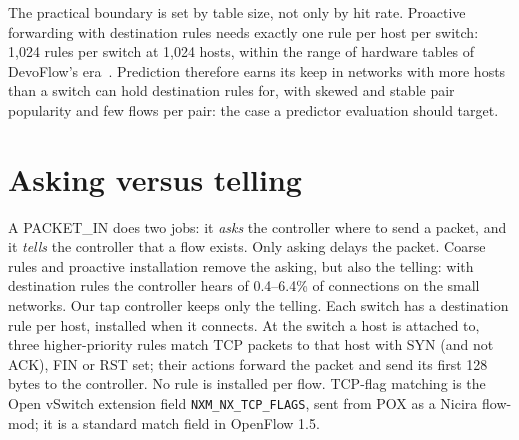\documentclass[sigconf]{acmart}
\begin{document}
The practical boundary is set by table size, not only by hit rate. Proactive forwarding with destination rules needs exactly one rule per host per switch: 1,024 rules per switch at 1,024 hosts, within the range of hardware tables of DevoFlow's era~\cite{devoflow}. Prediction therefore earns its keep in networks with more hosts than a switch can hold destination rules for, with skewed and stable pair popularity and few flows per pair: the case a predictor evaluation should target.

\section{Asking versus telling}\label{sec:tap}

A PACKET\_IN does two jobs: it \emph{asks} the controller where to send a packet, and it \emph{tells} the controller that a flow exists. Only asking delays the packet. Coarse rules and proactive installation remove the asking, but also the telling: with destination rules the controller hears of 0.4--6.4\% of connections on the small networks. Our tap controller keeps only the telling. Each switch has a destination rule per host, installed when it connects. At the switch a host is attached to, three higher-priority rules match TCP packets to that host with SYN (and not ACK), FIN or RST set; their actions forward the packet and send its first 128 bytes to the controller. No rule is installed per flow. TCP-flag matching is the Open vSwitch extension field \texttt{NXM\_NX\_TCP\_FLAGS}, sent from POX as a Nicira flow-mod; it is a standard match field in OpenFlow 1.5.
\end{document}
